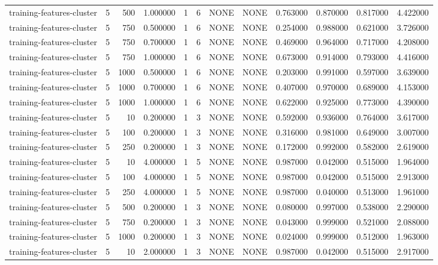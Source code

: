 \begin{tabular}{lrrrllllrrrr}
training-features-cluster & 5 & 500 & 1.000000 & 1 & 6 & NONE & NONE & 0.763000 & 0.870000 & 0.817000 & 4.422000 \\
training-features-cluster & 5 & 750 & 0.500000 & 1 & 6 & NONE & NONE & 0.254000 & 0.988000 & 0.621000 & 3.726000 \\
training-features-cluster & 5 & 750 & 0.700000 & 1 & 6 & NONE & NONE & 0.469000 & 0.964000 & 0.717000 & 4.208000 \\
training-features-cluster & 5 & 750 & 1.000000 & 1 & 6 & NONE & NONE & 0.673000 & 0.914000 & 0.793000 & 4.416000 \\
training-features-cluster & 5 & 1000 & 0.500000 & 1 & 6 & NONE & NONE & 0.203000 & 0.991000 & 0.597000 & 3.639000 \\
training-features-cluster & 5 & 1000 & 0.700000 & 1 & 6 & NONE & NONE & 0.407000 & 0.970000 & 0.689000 & 4.153000 \\
training-features-cluster & 5 & 1000 & 1.000000 & 1 & 6 & NONE & NONE & 0.622000 & 0.925000 & 0.773000 & 4.390000 \\
training-features-cluster & 5 & 10 & 0.200000 & 1 & 3 & NONE & NONE & 0.592000 & 0.936000 & 0.764000 & 3.617000 \\
training-features-cluster & 5 & 100 & 0.200000 & 1 & 3 & NONE & NONE & 0.316000 & 0.981000 & 0.649000 & 3.007000 \\
training-features-cluster & 5 & 250 & 0.200000 & 1 & 3 & NONE & NONE & 0.172000 & 0.992000 & 0.582000 & 2.619000 \\
training-features-cluster & 5 & 10 & 4.000000 & 1 & 5 & NONE & NONE & 0.987000 & 0.042000 & 0.515000 & 1.964000 \\
training-features-cluster & 5 & 100 & 4.000000 & 1 & 5 & NONE & NONE & 0.987000 & 0.042000 & 0.515000 & 2.913000 \\
training-features-cluster & 5 & 250 & 4.000000 & 1 & 5 & NONE & NONE & 0.987000 & 0.040000 & 0.513000 & 1.961000 \\
training-features-cluster & 5 & 500 & 0.200000 & 1 & 3 & NONE & NONE & 0.080000 & 0.997000 & 0.538000 & 2.290000 \\
training-features-cluster & 5 & 750 & 0.200000 & 1 & 3 & NONE & NONE & 0.043000 & 0.999000 & 0.521000 & 2.088000 \\
training-features-cluster & 5 & 1000 & 0.200000 & 1 & 3 & NONE & NONE & 0.024000 & 0.999000 & 0.512000 & 1.963000 \\
training-features-cluster & 5 & 10 & 2.000000 & 1 & 3 & NONE & NONE & 0.987000 & 0.042000 & 0.515000 & 2.917000 \\

\end{tabular}
